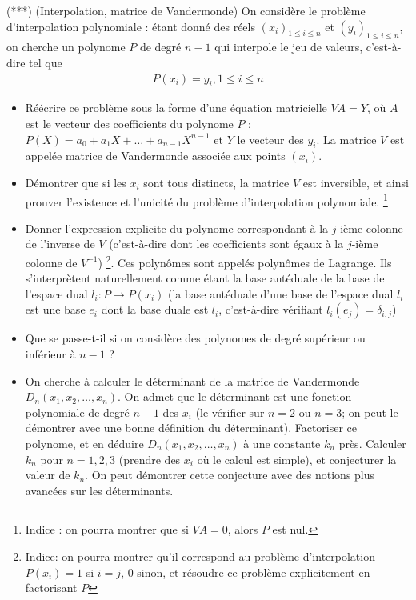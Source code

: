 \documentclass[10pt,a4paper]{article}
\newcounter{numeroexo}
\newcommand{\exercice}{\medskip\par\noindent\stepcounter{numeroexo}
  \hspace{-.25cm}{\textbf{Exercice \arabic{numeroexo}}}\quad}
\begin{document}
\exercice (***) (Interpolation, matrice de Vandermonde) On considère le problème d'interpolation
polynomiale : étant donné des réels $(x_i)_{1 \leq i \leq n}$ et
$(y_i)_{1 \leq i \leq n}$, on cherche un polynome $P$ de degré $n-1$
qui interpole le jeu de valeurs, c'est-à-dire tel que
\begin{align*}
  P(x_i) = y_i, 1 \leq i \leq n
\end{align*}
\begin{itemize}
\item Réécrire ce problème sous la forme d'une équation matricielle $V
  A = Y$, o\`u $A$ est le vecteur des coefficients du polynome $P$ :
  $P(X) = a_0 + a_1 X + \dots + a_{n-1} X^{n-1}$ et $Y$ le vecteur des
  $y_i$.  La matrice $V$ est appelée matrice de Vandermonde associée
  aux points $(x_i)$.
\item Démontrer que si les $x_i$ sont tous distincts, la matrice $V$
  est inversible, et ainsi prouver l'existence et l'unicité du
  problème d'interpolation polynomiale. \footnote{Indice : on pourra
    montrer que si $V A = 0$, alors $P$ est nul.}
\item Donner l'expression explicite du polynome correspondant à la
  $j$-ième colonne de l'inverse de $V$ (c'est-à-dire dont les
  coefficients sont égaux à la $j$-ième colonne de $V^{-1}$)
  \footnote{Indice: on pourra montrer qu'il correspond au problème
    d'interpolation $P(x_i) = 1$ si $i = j$, 0 sinon, et résoudre ce
    problème explicitement en factorisant $P$}. Ces polynômes sont
  appelés polynômes de Lagrange. Ils s'interprètent naturellement
  comme étant la base antéduale de la base de l'espace dual $l_i : P
  \to P(x_i)$ (la base antéduale d'une base de l'espace dual $l_i$ est
  une base $e_i$ dont la base duale est $l_i$, c'est-à-dire vérifiant
  $l_i(e_j) = \delta_{i,j}$)
\item Que se passe-t-il si on considère des polynomes
  de degré supérieur ou inférieur à $n-1$ ?
\item On cherche à calculer le déterminant de la matrice de
  Vandermonde $D_n(x_1, x_2, \dots, x_n)$. On admet que le déterminant
  est une fonction polynomiale de degré $n-1$ des $x_i$ (le vérifier
  sur $n = 2$ ou $n = 3$; on peut le démontrer avec une bonne
  définition du déterminant). Factoriser ce polynome, et en déduire
  $D_n(x_1, x_2, \dots, x_n)$ à une constante $k_n$ près. Calculer
  $k_n$ pour $n = 1, 2, 3$ (prendre des $x_i$ où le calcul est
  simple), et conjecturer la valeur de $k_n$. On peut démontrer cette
  conjecture avec des notions plus avancées sur les déterminants.
\end{itemize}
\end{document}
